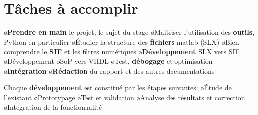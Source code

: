 \section{Tâches à accomplir}

\begin{frame} 
    \BI
		\o \textbf{Prendre en main} le projet, le sujet du stage
		\o Maitriser l'utilisation des \textbf{outils}, Python en particulier
		\o \'Etudier la structure des \textbf{fichiers} matlab (SLX)
		\o Bien comprendre le \textbf{SIF} et les filtres numériques
		\o \textbf{Développement} SLX vers SIF
		\o Développement oSoP vers VHDL 
		\o Test, \textbf{débogage} et optimisation
		\o \textbf{Intégration}
		\o \textbf{Rédaction} du rapport et des autres documentations
    \EI
\end{frame} 
\begin{frame} 
Chaque \textbf{développement} est constitué par les étapes suivantes:
	\BI
		\o \'Etude de l'existant
		\o Prototypage
		\o Test et validation
		\o Analyse des résultats et correction
		\o Intégration de la fonctionnalité
	\EI
\end{frame}
